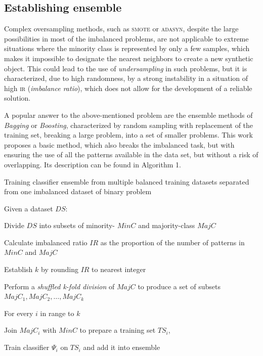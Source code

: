 \documentclass[pmlr]{jmlr}
\begin{document}
\subsection{Establishing ensemble}

Complex oversampling methods, such as \textsc{smote} or \textsc{adasyn}, despite the large possibilities in most of the imbalanced problems, are not applicable to extreme situations where the minority class is represented by only a few samples, which makes it impossible to designate the nearest neighbors to create a new synthetic object. This could lead to the use of \emph{undersampling} in such problems, but it is characterized, due to high randomness, by a strong instability in a situation of high \textsc{ir} (\emph{imbalance ratio}), which does not allow for the development of a reliable solution.

A popular answer to the above-mentioned problem are the ensemble methods of \emph{Bagging} or \emph{Boosting}, characterized by random sampling with replacement of the training set, breaking a large problem, into a set of smaller problems. This work proposes a basic method, which also breaks the imbalanced task, but with ensuring the use of all the patterns available in the data set, but without a risk of overlapping. Its description can be found in Algorithm 1.

\begin{algorithm}[!h]
\caption{Training classifier ensemble from multiple balanced training datasets separated from one imbalanced dataset of binary problem}\label{alg:moore}
Given a dataset $DS$:
\begin{enumerate*}
	\item Divide $DS$ into subsets of minority- $MinC$ and majority-class $MajC$
	\item Calculate imbalanced ratio $IR$ as the proportion of the number of patterns in $MinC$ and $MajC$ 
	\item Establish $k$ by rounding $IR$ to nearest integer
	\item Perform a \emph{shuffled k-fold division} of $MajC$ to produce a set of subsets $MajC_1, MajC_2, \ldots, MajC_k$ 
	\item For every $i$ in range to $k$
	\begin{enumerate*}
		\item Join $MajC_i$ with $MinC$ to prepare a training set $TS_i$,
		\item Train classifier $\Psi_i$ on $TS_i$ and add it into ensemble
	\end{enumerate*}
\end{enumerate*}
\end{algorithm}
\end{document}
